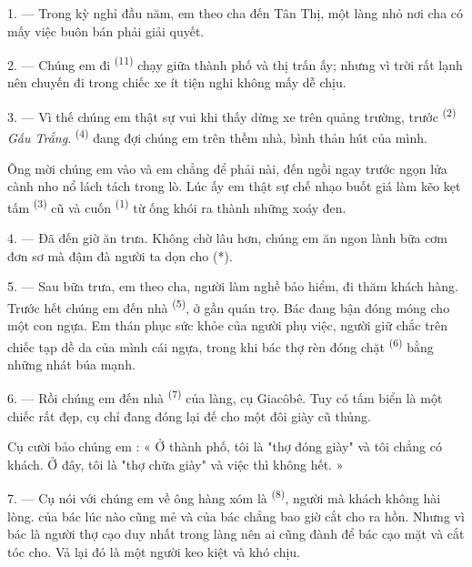1. --- Trong kỳ nghỉ đầu năm, em theo cha đến Tân Thị, một làng nhỏ nơi cha có mấy việc
buôn bán phải giải quyết.

2. --- Chúng em đi  \textsuperscript{(11)} chạy giữa thành phố và thị
trấn ấy; nhưng vì trời rất lạnh nên chuyến đi trong chiếc xe ít tiện nghi không mấy dễ
chịu.

3. --- Vì thế chúng em thật sự vui khi thấy  dừng xe trên quảng
trường, trước  \textsuperscript{(2)} \textit{Gấu Trắng}.  \textsuperscript{(4)} đang đợi chúng em trên thềm nhà, bình thản hút 
của mình.

Ông mời chúng em vào và em chẳng để phải nài, đến ngồi ngay trước ngọn lửa cành nho nổ
lách tách trong lò. Lúc ấy em thật sự chế nhạo  buốt giá làm kẽo
kẹt tấm  \textsuperscript{(3)} cũ và cuốn 
\textsuperscript{(1)} từ ống khói ra thành những xoáy đen.

4. --- Đã đến giờ ăn trưa. Không chờ lâu hơn, chúng em ăn ngon lành bữa cơm đơn sơ mà
đậm đà người ta dọn cho (*).

\VUsaut{3.0mm}

5. --- Sau bữa trưa, em theo cha, người làm nghề bảo hiểm, đi thăm khách hàng. Trước hết
chúng em đến nhà  \textsuperscript{(5)}, ở gần quán trọ. Bác đang
bận đóng móng cho một con ngựa. Em thán phục sức khỏe của người phụ việc, người giữ chắc
trên chiếc tạp dề da của mình cái  ngựa, trong khi bác thợ rèn đóng chặt
 \textsuperscript{(6)} bằng những nhát búa mạnh.

6. --- Rồi chúng em đến nhà  \textsuperscript{(7)} của làng, cụ
Giacôbê. Tuy có tấm biển là một chiếc  rất đẹp, cụ chỉ đang đóng lại đế cho
một đôi giày cũ thủng.

Cụ cười bảo chúng em : « Ở thành phố, tôi là "thợ đóng giày" và tôi chẳng có khách. Ở
đây, tôi là "thợ chữa giày" và việc thì không hết. »

7. --- Cụ nói với chúng em về ông hàng xóm là 
\textsuperscript{(8)}, người mà khách không hài lòng.  của bác lúc nào
cũng mẻ và  của bác chẳng bao giờ cắt cho ra hồn. Nhưng vì bác là người thợ
cạo duy nhất trong làng nên ai cũng đành để bác cạo mặt và cắt tóc cho. Vả lại đó là một
người keo kiệt và khó chịu.

